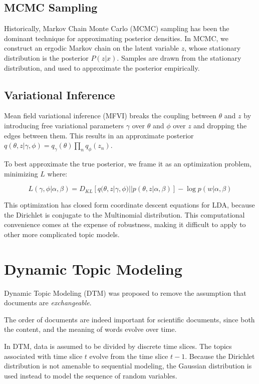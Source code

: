 \documentclass[letterpaper]{article}
\begin{document}
\subsection{MCMC Sampling}
\label{subsec:mcmc-sampling}
Historically, Markov Chain Monte Carlo (MCMC) sampling has been the
dominant technique for approximating posterior densities. In MCMC, we
construct an ergodic Markov chain on the latent variable $z$,
whose stationary distribution is the posterior $P( z | x)$.
Samples are drawn from the stationary distribution, and used to
approximate the posterior empirically.

\subsection{Variational Inference}
\label{subsec:vi}
Mean field variational inference (MFVI) breaks the coupling between
$\theta$ and $z$ by introducing free variational parameters $\gamma$
over $\theta$ and $\phi$ over $z$ and dropping the edges between them.
This results in an approximate posterior $q(\theta, z | \gamma, \phi)
= q_\gamma(\theta)\prod_nq_\phi(z_n)$.

To best approximate the true posterior, we frame it as an optimization
problem, minimizing $L$ where:

\begin{equation}
L(\gamma, \phi | \alpha, \beta) = D_{KL}\left[ q(\theta, z | \gamma,
  \phi) || p(\theta, z | \alpha, \beta) \right] - \log p(w | \alpha, \beta)
\end{equation}

This optimization has closed form coordinate descent equations for
LDA, because the Dirichlet is conjugate to the Multinomial
distribution. This computational convenience comes at the expense of
robustness, making it difficult to apply to other more complicated
topic models.

\section{Dynamic Topic Modeling}
\label{sec:dtm}
Dynamic Topic Modeling (DTM) was proposed to remove the assumption
that documents are \textit{exchangeable}. \citep{blei2006dynamic}

The order of documents are indeed important for scientific documents,
since both the content, and the meaning of words evolve over time.

In DTM, data is assumed to be divided by discrete time slices. The
topics associated with time slice $t$ evolve from the time slice
$t-1$. Because the Dirichlet distribution is not amenable to
sequential modeling, the Gaussian distribution is used instead to
model the sequence of random variables.
\end{document}
